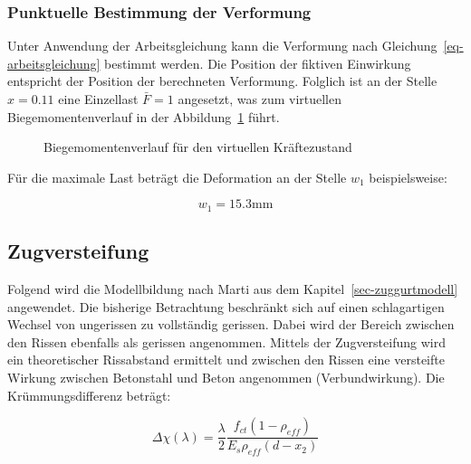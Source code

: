 \documentclass[
  12pt,
  letterpaper,
  egregdoesnotlikesansseriftitles]{scrreprt}
\begin{document}
\subsubsection{Punktuelle Bestimmung der
Verformung}\label{punktuelle-bestimmung-der-verformung}

Unter Anwendung der Arbeitsgleichung kann die Verformung nach
Gleichung~\ref{eq-arbeitsgleichung} bestimmt werden. Die Position der
fiktiven Einwirkung entspricht der Position der berechneten Verformung.
Folglich ist an der Stelle \(x=0.11\) eine Einzellast \(\bar{F} = 1\)
angesetzt, was zum virtuellen Biegemomentenverlauf in der
Abbildung~\ref{fig-m_x_diagramm_virtuell} führt.

\begin{figure}[H]


\caption{\label{fig-m_x_diagramm_virtuell}Biegemomentenverlauf für den
virtuellen Kräftezustand}

\end{figure}%

Für die maximale Last beträgt die Deformation an der Stelle \(w_1\)
beispielsweise:

\begin{equation}w_{1} = 15.3 \text{mm}\end{equation}

\subsection{Zugversteifung}\label{zugversteifung}

Folgend wird die Modellbildung nach Marti aus dem
Kapitel~\ref{sec-zuggurtmodell} angewendet. Die bisherige Betrachtung
beschränkt sich auf einen schlagartigen Wechsel von ungerissen zu
vollständig gerissen. Dabei wird der Bereich zwischen den Rissen
ebenfalls als gerissen angenommen. Mittels der Zugversteifung wird ein
theoretischer Rissabstand ermittelt und zwischen den Rissen eine
versteifte Wirkung zwischen Betonstahl und Beton angenommen
(Verbundwirkung). Die Krümmungsdifferenz beträgt:

\begin{equation}\Delta\chi{\left(\lambda \right)} = \frac{\lambda}{2} \frac{f_{ct} \left(1 - \rho_{eff}\right)}{E_{s} \rho_{eff} \left(d - x_{2}\right)}\end{equation}
\end{document}
